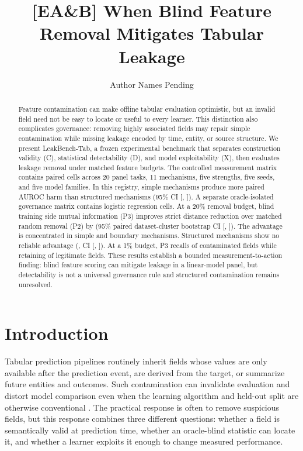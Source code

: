\documentclass[sigconf,review]{acmart}
\title{[EA\&B] When Blind Feature Removal Mitigates Tabular Leakage}
\author{Author Names Pending}
\affiliation{%
  \institution{Affiliations Pending}
  \city{City Pending}
  \country{Country Pending}}
\begin{document}
\setlength{\emergencystretch}{0.75em}

\begin{abstract}
Feature contamination can make offline tabular evaluation optimistic, but an
invalid field need not be easy to locate or useful to every learner. This
distinction also complicates governance: removing highly associated fields may
repair simple contamination while missing leakage encoded by time, entity, or
source structure. We present LeakBench-Tab, a frozen experimental benchmark
that separates construction validity (C), statistical detectability (D), and
model exploitability (X), then evaluates leakage removal under matched feature
budgets. The controlled measurement matrix contains \CoreCellCount{} paired
cells across 20 panel tasks, 11 mechanisms, five strengths, five seeds, and
five model families. In this registry, simple mechanisms produce \CoreContrast{}
more paired AUROC harm than structured mechanisms (95\% CI
[\CoreContrastLow{}, \CoreContrastHigh{}]). A separate oracle-isolated
governance matrix contains \GovernanceCellCount{} logistic regression cells.
At a 20\% removal budget, blind training side mutual information (P3) improves
strict distance reduction over matched random removal (P2) by
\GovTwentyDiff{} (95\% paired dataset-cluster bootstrap CI
[\GovTwentyLow{}, \GovTwentyHigh{}]). The advantage is concentrated in simple
and boundary mechanisms. Structured mechanisms show no reliable advantage
(\GovStructuredDiff{}, CI [\GovStructuredLow{}, \GovStructuredHigh{}]). At a
1\% budget, P3 recalls \GovOneRecall{} of contaminated fields while retaining
\GovOneRetention{} of legitimate fields. These results establish a bounded
measurement-to-action finding: blind feature scoring can mitigate leakage in a
linear-model panel, but detectability is not a universal governance rule and
structured contamination remains unresolved.
\end{abstract}


\maketitle

\section{Introduction}

Tabular prediction pipelines routinely inherit fields whose values are only
available after the prediction event, are derived from the target, or summarize
future entities and outcomes. Such contamination can invalidate evaluation and
distort model comparison even when the learning algorithm and held-out split
are otherwise conventional \cite{kaufman2011leakage,kapoor2023leakage}. The
practical response is often to remove suspicious fields, but this response
combines three different questions: whether a field is semantically valid at
prediction time, whether an oracle-blind statistic can locate it, and whether a
learner exploits it enough to change measured performance.
\end{document}
